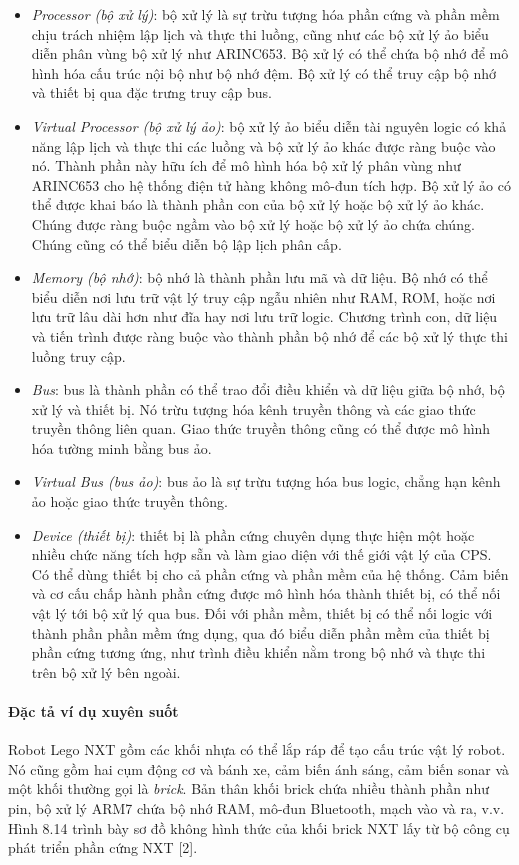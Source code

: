 \begin{itemize}
\item \emph{Processor (bộ xử lý)}: bộ xử lý là sự trừu tượng hóa phần cứng và phần mềm chịu trách nhiệm lập lịch và thực thi luồng, cũng như các bộ xử lý ảo biểu diễn phân vùng bộ xử lý như ARINC653. Bộ xử lý có thể chứa bộ nhớ để mô hình hóa cấu trúc nội bộ như bộ nhớ đệm. Bộ xử lý có thể truy cập bộ nhớ và thiết bị qua đặc trưng truy cập bus.
\item \emph{Virtual Processor (bộ xử lý ảo)}: bộ xử lý ảo biểu diễn tài nguyên logic có khả năng lập lịch và thực thi các luồng và bộ xử lý ảo khác được ràng buộc vào nó. Thành phần này hữu ích để mô hình hóa bộ xử lý phân vùng như ARINC653 cho hệ thống điện tử hàng không mô-đun tích hợp. Bộ xử lý ảo có thể được khai báo là thành phần con của bộ xử lý hoặc bộ xử lý ảo khác. Chúng được ràng buộc ngầm vào bộ xử lý hoặc bộ xử lý ảo chứa chúng. Chúng cũng có thể biểu diễn bộ lập lịch phân cấp.
\item \emph{Memory (bộ nhớ)}: bộ nhớ là thành phần lưu mã và dữ liệu. Bộ nhớ có thể biểu diễn nơi lưu trữ vật lý truy cập ngẫu nhiên như RAM, ROM, hoặc nơi lưu trữ lâu dài hơn như đĩa hay nơi lưu trữ logic. Chương trình con, dữ liệu và tiến trình được ràng buộc vào thành phần bộ nhớ để các bộ xử lý thực thi luồng truy cập.
\item \emph{Bus}: bus là thành phần có thể trao đổi điều khiển và dữ liệu giữa bộ nhớ, bộ xử lý và thiết bị. Nó trừu tượng hóa kênh truyền thông và các giao thức truyền thông liên quan. Giao thức truyền thông cũng có thể được mô hình hóa tường minh bằng bus ảo.
\item \emph{Virtual Bus (bus ảo)}: bus ảo là sự trừu tượng hóa bus logic, chẳng hạn kênh ảo hoặc giao thức truyền thông.
\item \emph{Device (thiết bị)}: thiết bị là phần cứng chuyên dụng thực hiện một hoặc nhiều chức năng tích hợp sẵn và làm giao diện với thế giới vật lý của CPS. Có thể dùng thiết bị cho cả phần cứng và phần mềm của hệ thống. Cảm biến và cơ cấu chấp hành phần cứng được mô hình hóa thành thiết bị, có thể nối vật lý tới bộ xử lý qua bus. Đối với phần mềm, thiết bị có thể nối logic với thành phần phần mềm ứng dụng, qua đó biểu diễn phần mềm của thiết bị phần cứng tương ứng, như trình điều khiển nằm trong bộ nhớ và thực thi trên bộ xử lý bên ngoài.
\end{itemize}

\paragraph{Đặc tả ví dụ xuyên suốt}
Robot Lego NXT gồm các khối nhựa có thể lắp ráp để tạo cấu trúc vật lý robot. Nó cũng gồm hai cụm động cơ và bánh xe, cảm biến ánh sáng, cảm biến sonar và một khối thường gọi là \emph{brick}. Bản thân khối brick chứa nhiều thành phần như pin, bộ xử lý ARM7 chứa bộ nhớ RAM, mô-đun Bluetooth, mạch vào và ra, v.v. Hình 8.14 trình bày sơ đồ không hình thức của khối brick NXT lấy từ bộ công cụ phát triển phần cứng NXT [2].


